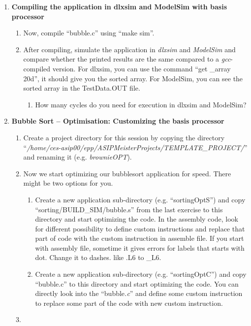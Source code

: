\begin{enumerate}
\item \textbf{Compiling the application in dlxsim and ModelSim with basis processor}
	\begin{enumerate}
		\item
		Now, compile ``bubble.c'' using ``make sim''.
		\item
		After compiling, simulate the application in \emph{dlxsim} and
		\emph{ModelSim} and compare whether the printed results are the same
		compared to a \emph{gcc}-compiled version. For dlxsim, you can use
		the command ``get \_array 20d'', it should give you the sorted
		array. For ModelSim, you can see the sorted array in the
		TestData.OUT file.
		\begin{enumerate}[label=(\alph*),start=3]
			\color{red}\item\normalcolor
			How many cycles do you need for execution in dlxsim and ModelSim?
		\end{enumerate}
	\end{enumerate}
\item \textbf{Bubble Sort -- Optimisation: Customizing the basis processor}
	\begin{enumerate}
		\item
		Create a project directory for this session by copying the directory
		``\emph{/home/ces-asip00/­epp/ASIP­Meister­Projects/TEMPLATE\_PROJECT/}''
		and renaming it (e.g. \emph{brownieOPT}).
		\item
		Now we start optimizing our bubblesort application for speed. There
		might be two options for you.
		\begin{enumerate}
			\item
			Create a new application sub-directory (e.g. ``sortingOptS'') and
			copy ``sorting/BUILD\_SIM/bubble.s'' from the last exercise to
			this directory and start optimizing the code. In the assembly
			code, look for different possibility to define custom instructions
			and replace that part of code with the custom instruction in
			assemble file. If you start with assembly file, sometime it gives
			errors for labels that starts with dot. Change it to dashes. like
			.L6 to \_L6.
			\item
			Create a new application sub-directory (e.g. ``sortingOptC'') and
			copy ``bubble.c'' to this directory and start optimizing the code.
			You can directly look into the ``bubble\emph{.c}'' and define some
			custom instruction to replace some part of the code with new
			custom instruction.
		\end{enumerate}
		\item

\end{enumerate}
\end{enumerate}
